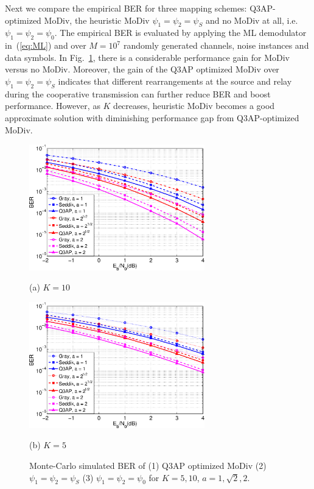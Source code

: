 \documentclass[journal,draftcls,onecolumn,12pt,twoside]{IEEEtran}
\begin{document}
Next we compare the empirical BER for three mapping schemes: Q3AP-optimized
MoDiv, the heuristic MoDiv $\psi_1 = \psi_2 = \psi_S$ and no MoDiv at all,
i.e. $\psi_1 = \psi_2 = \psi_0$. The empirical BER is evaluated by applying the
ML demodulator in~(\ref{eq:ML}) and over $M=10^7$ randomly generated channels, 
noise instances and data symbols. In Fig.~\ref{fig:montecarlo}, there is a
considerable performance gain for MoDiv versus no MoDiv. Moreover, the gain of
the Q3AP optimized MoDiv over $\psi_1 = \psi_2 = \psi_S$ indicates that
different rearrangements at the source and relay during the cooperative
transmission can further reduce BER and boost performance. However, as $K$
decreases, heuristic MoDiv becomes a good approximate solution with diminishing
performance gap from Q3AP-optimized MoDiv.

\begin{figure}[!t]
    \begin{minipage}[b]{0.49\linewidth}
      \centering
      \centerline{\includegraphics[width=3.0in]{./figs/MC_10.eps}}
      \centerline{(a) $ K = 10$}\medskip
    \end{minipage}
    \hfill
    \begin{minipage}[b]{0.49\linewidth}
      \centering
      \centerline{\includegraphics[width=3.0in]{./figs/MC_5.eps}}
      \centerline{(b) $K=5$}\medskip
    \end{minipage}
    \caption{Monte-Carlo simulated BER of (1) Q3AP optimized MoDiv
    (2) $\psi_1 = \psi_2 = \psi_S$ (3) $\psi_1 = \psi_2 = \psi_0$ for $K = 5,
    10$, $a = 1, \sqrt{2}, 2$.}
    \label{fig:montecarlo}
\end{figure}
\end{document}
